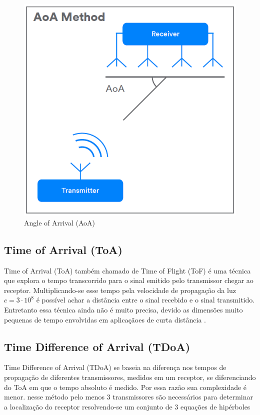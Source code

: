 \begin{figure}[H]
	\centering 
	\includegraphics[scale = 0.6]{images/angle_of_arrival.png}
	\caption{Angle of Arrival (AoA)}
	\label{fig:angle_of_arrival}
\end{figure}

\subsection{Time of Arrival (ToA)}

Time of Arrival (ToA) também chamado de  Time of Flight (ToF) é uma técnica que explora o tempo transcorrido para o sinal emitido pelo transmissor chegar ao receptor. Multiplicando-se esse tempo pela velocidade de propagação da luz \(c = 3 \cdot 10^8\) é possível achar a distância entre o sinal recebido e o sinal transmitido. Entretanto essa técnica ainda não é muito precisa, devido as dimensões muito pequenas de tempo envolvidas em aplicaçãoes de curta distância \cite{art6}.

\subsection{Time Difference of Arrival (TDoA)}

Time Difference of Arrival (TDoA) se baseia na diferença nos tempos de propagação de diferentes transmissores, medidos em um receptor, se diferenciando do ToA em que o tempo absoluto é medido. Por essa razão sua complexidade é menor.
nesse método pelo menos 3 transmissores são necessários para determinar a localização do receptor resolvendo-se um conjunto de 3 equações de hipérboles \cite{art2}

